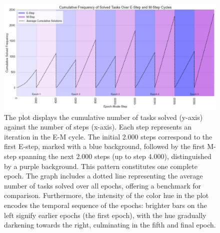 \begin{figure}[H]
    \centering
    \includegraphics[width=\textwidth]{../img/em_cycles_depth_3_48_tasks2023-12-07 22:24:45.png}
    \caption{The plot displays the cumulative number of tasks solved (y-axis) against the number of steps (x-axis). Each step represents an iteration in the E-M cycle. The initial 2.000 steps correspond to the first E-step, marked with a blue background, followed by the first M-step spanning the next 2.000 steps (up to step 4.000), distinguished by a purple background. This pattern constitutes one complete epoch. The graph includes a dotted line representing the average number of tasks solved over all epochs, offering a benchmark for comparison. Furthermore, the intensity of the color hue in the plot encodes the temporal sequence of the epochs: brighter bars on the left signify earlier epochs (the first epoch), with the hue gradually darkening towards the right, culminating in the fifth and final epoch.}
    \label{fig:em_cycles}
\end{figure}